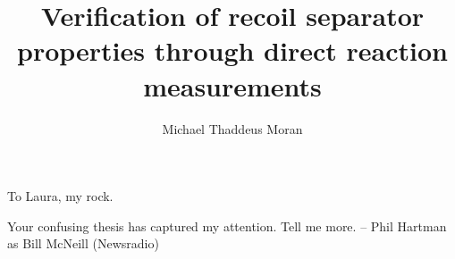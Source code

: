 \documentclass[final, twoadvisors]{nddiss2e}
\begin{document}
\frontmatter

\title{Verification of recoil separator properties through direct reaction measurements}
\author{Michael Thaddeus Moran}

\maketitle



\begin{dedication}
To Laura, my rock.
\end{dedication}

\tableofcontents
\listoffigures
\listoftables

% 

\begin{dedication}
Your confusing thesis has captured my attention. Tell me more.
\newline\---{} Phil Hartman as Bill McNeill (Newsradio)
\end{dedication}

\mainmatter







\appendix





\backmatter



\end{document}
